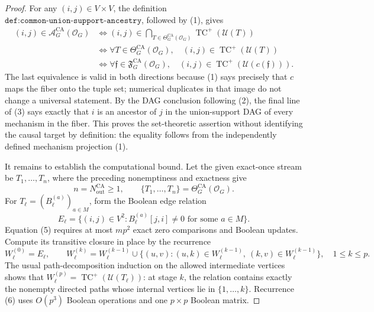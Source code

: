 \documentclass{article}
\begin{document}
\begin{proof}
For any \((i,j)\in V\times V\), the definition
\(\texttt{def:common-union-support-ancestry}\), followed by (1), gives
\[
\begin{aligned}
 (i,j)\in\mathcal A_G^{\mathrm{CA}}(\mathcal O_G)
 &\Longleftrightarrow
   (i,j)\in
   \bigcap_{T\in\Theta_G^{\mathrm{CA}}(\mathcal O_G)}
        \operatorname{TC}^{+}(\mathcal U(T))                                      \\
 &\Longleftrightarrow
   \forall T\in\Theta_G^{\mathrm{CA}}(\mathcal O_G),\quad
   (i,j)\in\operatorname{TC}^{+}(\mathcal U(T))                                  \\
 &\Longleftrightarrow
   \forall\mathfrak f\in\mathfrak F_G^{\mathrm{CA}}(\mathcal O_G),\quad
   (i,j)\in
   \operatorname{TC}^{+}(\mathcal U(c(\mathfrak f))).
 \tag{3}
\end{aligned}
\]
The last equivalence is valid in both directions because (1) says precisely
that \(c\) maps the fiber onto the tuple set; numerical duplicates in that
image do not change a universal statement.  By the DAG conclusion following
(2), the final line of (3) says exactly that \(i\) is an ancestor of \(j\) in
the union-support DAG of every mechanism in the fiber.  This proves the
set-theoretic assertion without identifying the causal target by definition:
the equality follows from the independently defined mechanism projection (1).

It remains to establish the computational bound.  Let the given exact-once
stream be \(T_1,\ldots,T_n\), where the preceding nonemptiness and exactness
give
\[
 n=N_{\mathrm{out}}^{\mathrm{CA}}\geq1,
 \qquad
 \{T_1,\ldots,T_n\}=\Theta_G^{\mathrm{CA}}(\mathcal O_G).
 \tag{4}
\]
For \(T_\ell=(B_\ell^{(a)})_{a\in M}\), form the Boolean edge relation
\[
 E_\ell=\{(i,j)\in V^2:
              B_\ell^{(a)}[j,i]\ne0
              \text{ for some }a\in M\}.
 \tag{5}
\]
Equation (5) requires at most \(mp^2\) exact zero comparisons and Boolean
updates.  Compute its transitive closure in place by the recurrence
\[
 W_\ell^{(0)}=E_\ell,
 \qquad
 W_\ell^{(k)}=W_\ell^{(k-1)}\cup
 \bigl\{(u,v):
 (u,k)\in W_\ell^{(k-1)},\ (k,v)\in W_\ell^{(k-1)}\bigr\},
 \quad 1\leq k\leq p.
 \tag{6}
\]
The usual path-decomposition induction on the allowed intermediate vertices
shows that \(W_\ell^{(p)}=\operatorname{TC}^{+}(\mathcal U(T_\ell))\): at
stage \(k\), the relation contains exactly the nonempty directed paths whose
internal vertices lie in \(\{1,\ldots,k\}\).  Recurrence (6) uses
\(O(p^3)\) Boolean operations and one \(p\times p\) Boolean matrix.


\end{proof}
\end{document}
